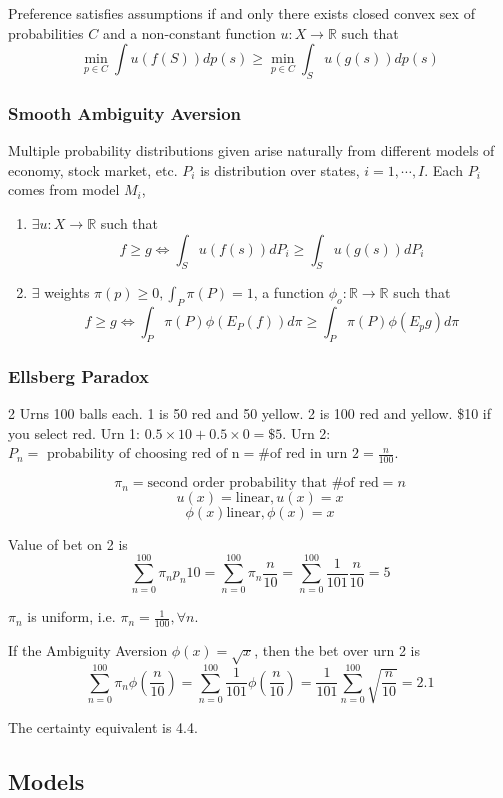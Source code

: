 \documentclass[11pt, a4paper, oneside]{article}
\theoremstyle{definition}
\theoremstyle{proposition}
\theoremstyle{corollary}
\theoremstyle{lemma}
\theoremstyle{theorem}
\begin{document}
Preference satisfies assumptions if and only there exists closed convex sex of probabilities $C$ and a non-constant function $u: X \to \mathbb{R}$ such that $$\min_{p\in C}\int u(f(S))dp(s) \geq \min_{p \in C}\int _S u(g(s))dp(s)$$

\subsubsection{Smooth Ambiguity Aversion}
Multiple probability distributions given arise naturally from different models of economy, stock market, etc. $P_i$ is distribution over states, $i = 1, \cdots, I$. Each $P_i$ comes from model $M_i$, 
\begin{enumerate}
\item $\exists u : X \to \mathbb{R}$ such that $$f \geq g \iff \int_S u(f(s))dP_i \geq \int_S u(g(s))dP_i$$
\item $\exists$ weights $\pi(p) \geq 0, \int_P\pi(P) = 1$, a function $\phi_o: \mathbb{R} \to\mathbb{R}$ such that 
$$f \geq g \iff \int_P\pi(P)\phi(E_P(f))d\pi \geq \int_P\pi(P)\phi(E_pg)d\pi$$
\end{enumerate}

\subsubsection{Ellsberg Paradox}
2 Urns 100 balls each. 1 is 50 red and 50 yellow. 2 is 100 red and yellow. \$10 if you select red. Urn 1: $0.5\times 10 + 0.5\times 0 = \$5$. Urn 2: $P_n=\text{ probability of choosing red of n}=\text{\# of red in urn 2}=\frac{n}{100}$. 

$$\pi_n=\text{second order probability that \# of red} = n$$
$$u(x) = \text{linear}, u(x) = x$$
$$\phi(x)\text{linear}, \phi(x) = x$$

Value of bet on 2 is $$\sum_{n=0}^{100}\pi_np_n 10 = \sum_{n=0}^{100}\pi_n \frac{n}{10}=\sum_{n=0}^{100} \frac{1}{101}\frac{n}{10}=5$$

$\pi_n$ is uniform, i.e. $\pi_n = \frac{1}{100}, \forall n$. 

If the Ambiguity Aversion $\phi(x) = \sqrt{x}$, then the bet over urn 2 is 
$$\sum_{n=0}^{100} \pi_n\phi(\frac{n}{10}) = \sum_{n=0}^{100}\frac{1}{101}\phi(\frac{n}{10}) = \frac{1}{101}\sum_{n=0}^{100}\sqrt{\frac{n}{10}}=2.1$$

The certainty equivalent is 4.4.

\subsection{Models}
\end{document}
